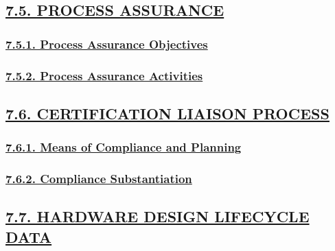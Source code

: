 \documentclass[
]{article}
\begin{document}
\hypertarget{process-assurance}{%
\subsection{\texorpdfstring{\protect\hyperlink{process-assurance-1}{7.5.
PROCESS ASSURANCE}}{7.5. PROCESS ASSURANCE}}\label{process-assurance}}

\hypertarget{process-assurance-objectives}{%
\subsubsection{\texorpdfstring{\protect\hyperlink{process-assurance-objectives-1}{7.5.1.
Process Assurance
Objectives}}{7.5.1. Process Assurance Objectives}}\label{process-assurance-objectives}}

\hypertarget{process-assurance-activities}{%
\subsubsection{\texorpdfstring{\protect\hyperlink{process-assurance-activities-1}{7.5.2.
Process Assurance
Activities}}{7.5.2. Process Assurance Activities}}\label{process-assurance-activities}}

\hypertarget{certification-liaison-process}{%
\subsection{\texorpdfstring{\protect\hyperlink{certification-liaison-process-1}{7.6.
CERTIFICATION LIAISON
PROCESS}}{7.6. CERTIFICATION LIAISON PROCESS}}\label{certification-liaison-process}}

\hypertarget{means-of-compliance-and-planning}{%
\subsubsection{\texorpdfstring{\protect\hyperlink{means-of-compliance-and-planning-1}{7.6.1.
Means of Compliance and
Planning}}{7.6.1. Means of Compliance and Planning}}\label{means-of-compliance-and-planning}}

\hypertarget{compliance-substantiation}{%
\subsubsection{\texorpdfstring{\protect\hyperlink{compliance-substantiation-1}{7.6.2.
Compliance
Substantiation}}{7.6.2. Compliance Substantiation}}\label{compliance-substantiation}}

\hypertarget{hardware-design-lifecycle-data}{%
\subsection{\texorpdfstring{\protect\hyperlink{hardware-design-lifecycle-data-1}{7.7.
HARDWARE DESIGN LIFECYCLE
DATA}}{7.7. HARDWARE DESIGN LIFECYCLE DATA}}\label{hardware-design-lifecycle-data}}
\end{document}
